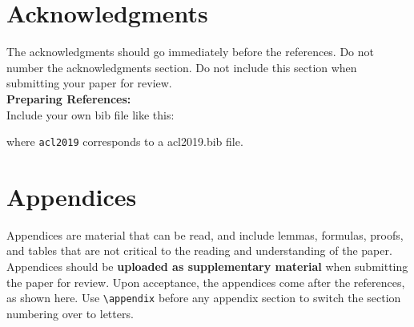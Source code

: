 \documentclass[11pt,a4paper]{article}
\begin{document}
\section*{Acknowledgments}

The acknowledgments should go immediately before the references.  Do
not number the acknowledgments section. Do not include this section
when submitting your paper for review. \\

\noindent \textbf{Preparing References:} \\
Include your own bib file like this:
\verb||
\verb|| 

where \verb|acl2019| corresponds to a acl2019.bib file.



\appendix

\section{Appendices}
\label{sec:appendix}
Appendices are material that can be read, and include lemmas, formulas, proofs, and tables that are not critical to the reading and understanding of the paper. 
Appendices should be \textbf{uploaded as supplementary material} when submitting the paper for review. Upon acceptance, the appendices come after the references, as shown here. Use
\verb|\appendix| before any appendix section to switch the section
numbering over to letters.
\end{document}

